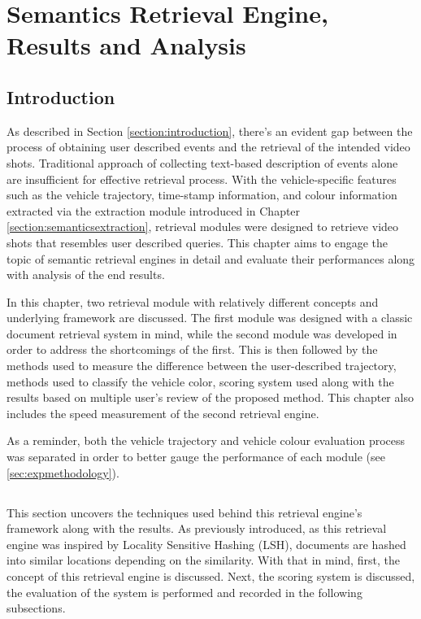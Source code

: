 
\chapter{Semantics Retrieval Engine, Results and Analysis}

\label{section:retrievalengine}
\section{Introduction}

As described in Section \ref{section:introduction}, there's an evident gap between the process of obtaining user described events and the retrieval of the intended video shots. Traditional approach of collecting text-based description of events alone are insufficient for effective retrieval process. With the vehicle-specific features such as the vehicle trajectory, time-stamp information, and colour information extracted via the extraction module introduced in Chapter \ref{section:semanticsextraction}, retrieval modules were designed to retrieve video shots that resembles user described queries. This chapter aims to engage the topic of semantic retrieval engines in detail and evaluate their performances along with analysis of the end results.

In this chapter, two retrieval module with relatively different concepts and underlying framework are discussed. The first module was designed with a classic document retrieval system in mind, while the second module was developed in order to address the shortcomings of the first. This is then followed by the methods used to measure the difference between the user-described trajectory, methods used to classify the vehicle color, scoring system used along with the results based on multiple user's review of the proposed method. This chapter also includes the speed measurement of the second retrieval engine.

As a reminder, both the vehicle trajectory and vehicle colour evaluation process was separated in order to better gauge the performance of each module (see \ref{sec:expmethodology}).






\section{\versionOneRet}
This section uncovers the techniques used behind this retrieval engine's framework along with the results. As previously introduced, as this retrieval engine was inspired by Locality Sensitive Hashing (LSH), documents are hashed into similar locations depending on the similarity. With that in mind, first, the concept of this retrieval engine is discussed. Next, the scoring system is discussed, the evaluation of the system is performed and recorded in the following subsections.




